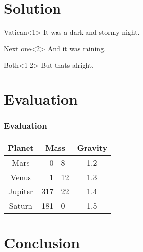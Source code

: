 \documentclass{beamer}
\begin{document}
\section{Solution}
\begin{frame}
	\begin{block}{Vatican}<1>
		It was a dark and stormy night.
	\end{block}

	\begin{block}{Next one}<2>
		And it was raining.
	\end{block}

	\begin{block}{Both}<1-2>
		But thats alright.
	\end{block}


\end{frame}


\section{Evaluation}
\begin{frame}
	\frametitle{Evaluation}
	\begin{center}
	\begin{tabular}{cr@{.}lc}
	\hline
	Planet & \multicolumn{2}{c}{Mass} & Gravity \\
	\hline
	Mars	& 0&8		& 1.2 \\
	Venus	& 1&12		& 1.3 \\
	Jupiter	& 317&22	& 1.4 \\
	Saturn	& 181&0		& 1.5 \\
	\hline
	\end{tabular}
	\end{center}
\end{frame}


\section{Conclusion}
\end{document}
